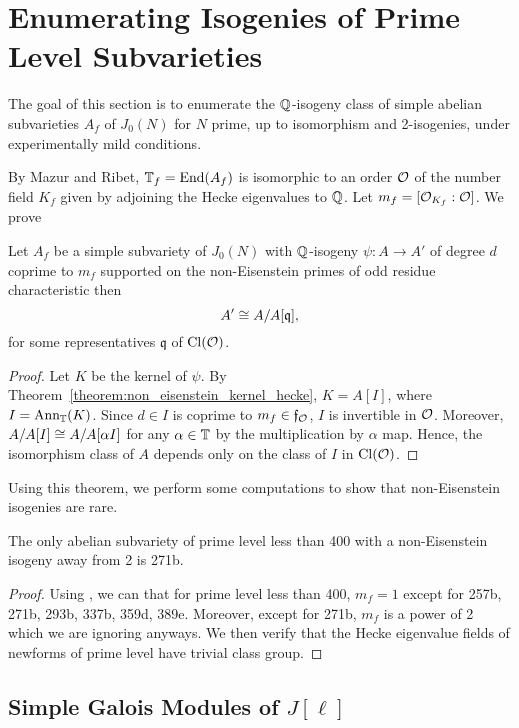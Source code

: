 \documentclass{article}
\begin{document}
    
\section{Enumerating Isogenies of Prime Level Subvarieties}

The goal of this section is to enumerate the $\mathbb{Q}$-isogeny class of simple
abelian subvarieties $A_f$ of $J_0(N)$ for $N$ prime, up to isomorphism and
2-isogenies, under experimentally mild conditions.

By Mazur and Ribet, $\mathbb{T}_f=\operatorname{End}(A_f)$ is isomorphic to an order $\mathcal{O}$ of the
number field $K_f$ given by adjoining the Hecke eigenvalues to $\mathbb{Q}$. Let
$m_f=[\mathcal{O}_{K_f}:\mathcal{O}]$. We prove 
\begin{theorem}
    Let $A_f$ be a simple subvariety of $J_0(N)$ with $\mathbb{Q}$-isogeny $\psi:A\to
    A'$ of degree $d$ coprime to $m_f$ supported on the non-Eisenstein primes
    of odd residue characteristic then
    \[
        A' \cong A/A[\mathfrak{q}],
    \]
    for some representatives $\mathfrak{q}$ of $\operatorname{Cl}(\mathcal{O})$.
\end{theorem}
\begin{proof}
    Let $K$ be the kernel of $\psi$. By
    Theorem~\ref{theorem:non_eisenstein_kernel_hecke}, $K=A[I]$, where
    $I=\operatorname{Ann}_{\mathbb{T}}(K)$. Since $d\in I$ is coprime to $m_f\in \mathfrak{f}_{\mathcal{O}}$,
    $I$ is invertible in $\mathcal{O}$. Moreover, $A/A[I]\cong A/A[\alpha I]$ for any
    $\alpha\in \mathbb{T}$ by the multiplication by $\alpha$ map. Hence, the
    isomorphism class of $A$ depends only on the class of $I$ in $\operatorname{Cl}(\mathcal{O})$.
\end{proof}

Using this theorem, we perform some computations to show that non-Eisenstein
isogenies are rare.
\begin{proposition}
    The only abelian subvariety of prime level less than 400 with a
    non-Eisenstein isogeny away from 2 is 271b.
\end{proposition}
\begin{proof}
    Using \sage, we can that for prime level less than 400, $m_f=1$ except for
    257b, 271b, 293b, 337b, 359d, 389e. Moreover, except for 271b, $m_f$ is a
    power of 2 which we are ignoring anyways. We then verify that the Hecke
    eigenvalue fields of newforms of prime level have trivial class group.
\end{proof}


\subsection{Simple Galois Modules of $J[\ell]$}\label{subsection:simple_galois_ell}
\end{document}
